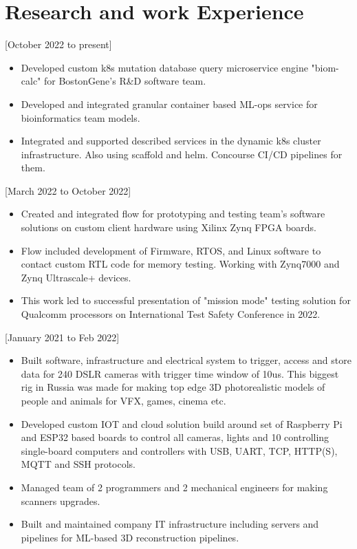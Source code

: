 \documentclass{article}
\begin{document}
\section{Research and work Experience}


[October 2022 to present]
   \begin{itemize}
      \item Developed custom k8s mutation database query microservice engine "biom-calc" for BostonGene's R\&D software team.
      \item Developed and integrated granular container based ML-ops service for bioinformatics team models.
      \item Integrated and supported described services in the dynamic k8s cluster infrastructure. Also using scaffold and helm. Concourse CI/CD pipelines for them.
    \end{itemize}

[March 2022 to October 2022]
   \begin{itemize}
      \item Created and integrated flow for prototyping and testing team's software solutions on custom client hardware using Xilinx Zynq FPGA boards.
      \item Flow included development of Firmware, RTOS, and Linux software to contact custom RTL code for memory testing. Working with Zynq7000 and Zynq Ultrascale+ devices.
      \item This work led to successful presentation of "mission mode" testing solution for Qualcomm processors on International Test Safety Conference in 2022.
   \end{itemize}  

[January 2021 to Feb 2022]
\begin{itemize}
   \item Built software, infrastructure and electrical system to trigger, access and store data for 240 DSLR cameras with trigger time window of 10us. This biggest rig in Russia was made for making top edge 3D photorealistic models of people and animals for VFX, games, cinema etc.
   \item Developed custom IOT and cloud solution build around set of Raspberry Pi and ESP32 based boards to control all cameras, lights and 10 controlling single-board computers and controllers with USB, UART, TCP, HTTP(S), MQTT and SSH protocols.
   \item Managed team of 2 programmers and 2 mechanical engineers for making scanners upgrades.
   \item Built and maintained company IT infrastructure including servers and pipelines for ML-based 3D reconstruction pipelines.
\end{itemize}
\end{document}
